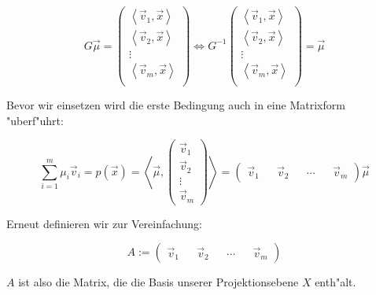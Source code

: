 \documentclass{article}
\newcommand{\lrangle}[1]{\left\langle #1 \right\rangle}
\begin{document}
    \begin{equation}
        G \vec{\mu} =
        \begin{pmatrix}
            \lrangle{ \vec{v}_1, \vec{x} } \\
            \lrangle{ \vec{v}_2, \vec{x} } \\
            \vdots \\
            \lrangle{ \vec{v}_m, \vec{x} } \\
        \end{pmatrix}
        \iff G^{-1}
        \begin{pmatrix}
            \lrangle{ \vec{v}_1, \vec{x} } \\
            \lrangle{ \vec{v}_2, \vec{x} } \\
            \vdots \\
            \lrangle{ \vec{v}_m, \vec{x} } \\
        \end{pmatrix} = \vec{\mu}
    \end{equation}

Bevor wir einsetzen wird die erste Bedingung auch in eine Matrixform
"uberf"uhrt:

    \begin{equation}
        \sum_{i=1}^{m}{\mu _i \vec{v}_i} = p(\vec{x}) =
        \lrangle{\vec{\mu},
        \begin{pmatrix}
            \vec{v}_1 \\
            \vec{v}_2 \\
            \vdots \\
            \vec{v}_m
        \end{pmatrix}
        } =
        \begin{pmatrix}
            \vec{v}_1 &&
            \vec{v}_2 &&
            \cdots &&
            \vec{v}_m
        \end{pmatrix}
        \vec{\mu}
    \end{equation}

Erneut definieren wir zur Vereinfachung:

    \begin{equation}
        A :=
        \begin{pmatrix}
            \vec{v}_1 &&
            \vec{v}_2 &&
            \cdots &&
            \vec{v}_m
        \end{pmatrix}
    \end{equation}

\(A\) ist also die Matrix, die die Basis unserer Projektionsebene \(X\)
enth"alt.
\end{document}
